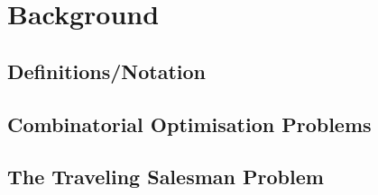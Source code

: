 \chapter{Background}
\section{Definitions/Notation}
\label{chap:BG}
\section{Combinatorial Optimisation Problems}
\label{sec:CO}
\section{The Traveling Salesman Problem}
\label{sec:TSP}

